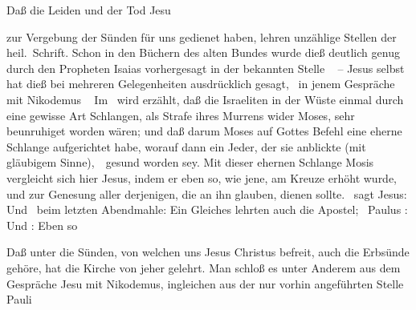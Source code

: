 \begin{aufza}
\item Daß die Leiden und der Tod Jesu
\begin{aufzb}
\item zur Vergebung der Sünden für uns gedienet haben, lehren unzählige Stellen der heil.\ Schrift. Schon in den Büchern des alten Bundes wurde dieß deutlich genug durch den Propheten Isaias vorhergesagt in der bekannten Stelle \  -- Jesus selbst hat dieß bei mehreren Gelegenheiten ausdrücklich gesagt, \zB\ in jenem Gespräche mit Nikodemus \  Im \ wird erzählt, daß die Israeliten in der Wüste einmal durch eine gewisse Art Schlangen, als Strafe ihres Murrens wider Moses, sehr beunruhiget worden wären; und daß darum Moses auf Gottes Befehl eine eherne Schlange aufgerichtet habe, worauf dann ein Jeder, der sie anblickte (mit gläubigem Sinne),~\ gesund worden sey. Mit dieser ehernen Schlange Mosis vergleicht sich hier Jesus, indem er eben so, wie jene, am Kreuze erhöht wurde, und zur Genesung aller derjenigen, die an ihn glauben, dienen sollte. \ sagt Jesus:  Und \ beim letzten Abendmahle:  Ein Gleiches lehrten auch die Apostel; \zB\ Paulus :  Und :  Eben so \ \usw\
\item Daß unter die Sünden, von welchen uns Jesus Christus befreit, auch die Erbsünde gehöre, hat die Kirche von jeher gelehrt. Man schloß es unter Anderem aus dem Gespräche Jesu mit Nikodemus, ingleichen aus der nur vorhin angeführten Stelle Pauli 

\end{aufzb}
\end{aufza}
